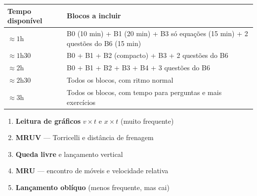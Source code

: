 \documentclass[12pt,a4paper]{article}
\begin{document}
\renewcommand{\arraystretch}{1.6}
\begin{tabularx}{\linewidth}{lX}
  \toprule
  \textbf{Tempo dispon\'ivel} & \textbf{Blocos a incluir} \\
  \midrule
  $\approx 1$h &
    B0 (10 min) + B1 (20 min) + B3 s\'o equa\c{c}\~oes (15 min)
    + 2 quest\~oes do B6 (15 min) \\
  $\approx 1$h30 &
    B0 + B1 + B2 (compacto) + B3 + 2 quest\~oes do B6 \\
  $\approx 2$h &
    B0 + B1 + B2 + B3 + B4 + 3 quest\~oes do B6 \\
  $\approx 2$h30 &
    Todos os blocos, com ritmo normal \\
  $\approx 3$h &
    Todos os blocos, com tempo para perguntas e mais exerc\'icios \\
  \bottomrule
\end{tabularx}

\bigskip

\begin{tcolorbox}[colback=azulphysics!5!white, colframe=azulphysics, arc=3mm,
  fonttitle=\bfseries, title={Prioridade dos t\'opicos para ENEM}]
  \begin{enumerate}[nosep]
    \item \textbf{Leitura de gr\'aficos} $v \times t$ e $x \times t$
          (muito frequente)
    \item \textbf{MRUV} --- Torricelli e dist\^ancia de frenagem
    \item \textbf{Queda livre} e lan\c{c}amento vertical
    \item \textbf{MRU} --- encontro de m\'oveis e velocidade relativa
    \item \textbf{Lan\c{c}amento obl\'iquo} (menos frequente, mas cai)
  \end{enumerate}
\end{tcolorbox}
\end{document}
